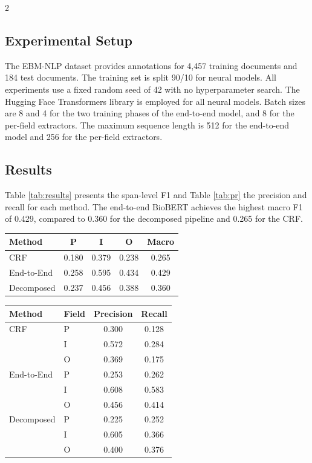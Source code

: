 \documentclass[11pt]{article}
\begin{document}
\begin{multicols}{2}
\subsection{Experimental Setup}
The EBM-NLP dataset provides annotations for 4,457 training documents and 184 test documents.
The training set is split 90/10 for neural models. All experiments use a fixed random seed of 42 with no hyperparameter search. The Hugging Face Transformers library \cite{wolf2020transformers} is employed for all neural models. Batch sizes are 8 and 4 for the two training phases of the end-to-end model, and 8 for the per-field extractors. The maximum sequence length is 512 for the end-to-end model and 256 for the per-field extractors.

\subsection{Results}
Table \ref{tab:results} presents the span-level F1 and Table \ref{tab:pr} the precision and recall for each method. The end-to-end BioBERT achieves the highest macro F1 of 0.429, compared to 0.360 for the decomposed pipeline and 0.265 for the CRF.

\begin{center}
\small
\begin{tabular}{lcccc}
\toprule
\textbf{Method} & \textbf{P} & \textbf{I} & \textbf{O} & \textbf{Macro} \\
\midrule
CRF        & 0.180 & 0.379 & 0.238 & 0.265 \\
End-to-End & 0.258 & 0.595 & 0.434 & 0.429 \\
Decomposed & 0.237 & 0.456 & 0.388 & 0.360 \\
\bottomrule
\end{tabular}
\label{tab:results}
\end{center}

\begin{center}
\small
\begin{tabular}{llcc}
\toprule
\textbf{Method} & \textbf{Field} & \textbf{Precision} & \textbf{Recall} \\
\midrule
CRF        & P & 0.300 & 0.128 \\
           & I & 0.572 & 0.284 \\
           & O & 0.369 & 0.175 \\
\midrule
End-to-End & P & 0.253 & 0.262 \\
           & I & 0.608 & 0.583 \\
           & O & 0.456 & 0.414 \\
\midrule
Decomposed & P & 0.225 & 0.252 \\
           & I & 0.605 & 0.366 \\
           & O & 0.400 & 0.376 \\
\bottomrule
\end{tabular}
\label{tab:pr}
\end{center}


\end{multicols}
\end{document}
